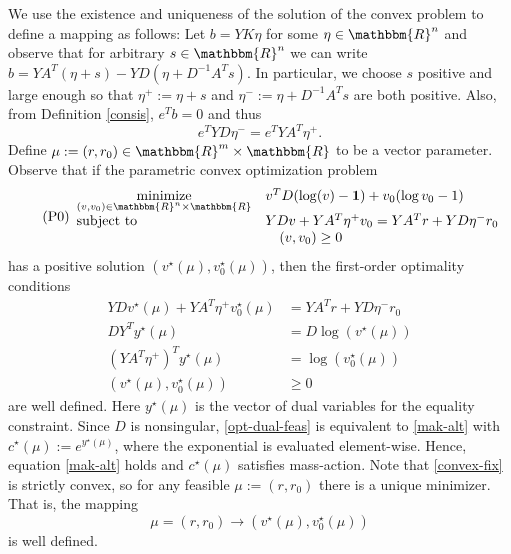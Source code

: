 \documentclass[smallextended]{svjour3}       %
\newcommand*{\0}{\mathbf{0}}
\newcommand*{\1}{\mathbf{1}}
\newcommand*{\minimize}{\text{minimize}}
\newcommand*{\st}{\text{subject to}}
\newcommand*{\R}{\mathbbm{R}}
\begin{document}
We use the existence and uniqueness of the solution of the convex problem 
to define a mapping as follows: Let $b=YK\eta$ for some $\eta \in \R^n$ and observe
that for arbitrary $s \in \R^n$ we can write $b = YA^T(\eta +s) - YD(\eta +
D^{-1}A^Ts)$.  In particular, we choose $s$ positive and large enough so
that $\eta^+ := \eta+s$ and $\eta^- := \eta + D^{-1}A^Ts$ are both positive.
Also, from Definition \ref{consis}, $e^Tb = 0$ and thus
\begin{equation}
  e^TYD\eta^- = e^TYA^T\eta^+.
  \label{massbalanceb}
\end{equation}
Define $\mu:=(r,r_0) \in \R^{m}\times\R$ to be a vector parameter.  Observe that if
the parametric convex optimization problem
\begin{equation}
  \tag{P0}
	\begin{array}{lll}
  \underset{(v,v_0)\in\R^{n}\times\R}{\minimize} & v^T D(\log(v)-\1) + v_0(\log v_0 -1) \\
	\st &  YD v + YA^T\eta^+ v_0 = YA^Tr + YD\eta^-r_0   \\
	    &\quad (v,v_0) \ge 0                     
	\end{array}
	\label{convex-fix}
\end{equation}
has a positive solution $(v^\star(\mu),v_0^\star(\mu))$, then the first-order optimality
conditions \cite{yinyu}
\begin{subequations}
    \label{opt-cond}
	\begin{align}
      YDv^\star(\mu)  + YA^T\eta^+ v^\star_0(\mu)  &= YA^Tr + YD\eta^-r_0  \label{opt-primal-feas}\\
      DY^T y^\star(\mu) &= D\log(v^\star(\mu))                        \label{opt-dual-feas}\\
      (YA^T\eta^+)^Ty^\star(\mu)   &= \log(v^\star_0(\mu))            \label{opt-dual-feas-two}\\
    (v^\star(\mu),v_0^\star(\mu)) &\ge 0                              \label{opt-primal-bounds}
	\end{align}
\end{subequations}
are well defined. Here $y^\star(\mu)$ is the vector of dual variables
for the equality constraint.
Since $D$ is nonsingular, \eqref{opt-dual-feas} is
equivalent to \eqref{mak-alt} with $c^\star(\mu) := e^{y^\star(\mu)}$, where
the exponential is evaluated element-wise.  Hence, equation \eqref{mak-alt} holds
and $c^\star(\mu)$ satisfies mass-action. Note that 
\eqref{convex-fix} is strictly convex, so for any feasible $\mu:=(r,r_0)$ there is 
a unique minimizer. That is, the mapping 
\begin{equation}
  \mu=(r,r_0) \rightarrow (v^\star(\mu),v^\star_0(\mu))
  \label{mapping}
\end{equation} 
is well defined.
\end{document}
